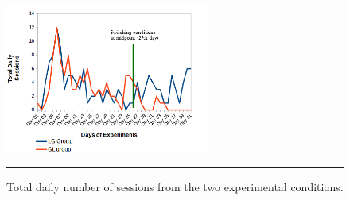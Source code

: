 \begin{figure}[htbp]
  \centering
    \includegraphics[width=0.6\textwidth]{Figures/usagedailysessions_lg_gl.png}
    \rule{35em}{0.5pt}
  \caption{Total daily number of sessions from the two experimental conditions.}
  \label{figure:usagedailysessions_lg_gl}
\end{figure}

